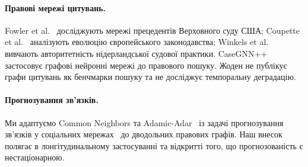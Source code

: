 \paragraph{Правові мережі цитувань.}
Fowler et al.~\citep{fowler2007network} досліджують мережі прецедентів Верховного суду США; Coupette et al.~\citep{coupette2021measuring} аналізують еволюцію європейського законодавства; Winkels et al.~\citep{winkels2011determining} вивчають авторитетність нідерландської судової практики.
CaseGNN++~\citep{tang2024casegnn} застосовує графові нейронні мережі до правового пошуку.
Жоден не публікує графи цитувань як бенчмарки пошуку та не досліджує темпоральну деградацію.

\paragraph{Прогнозування зв'язків.}
Ми адаптуємо Common Neighbors та Adamic-Adar~\citep{adamic2003friends} із задачі прогнозування зв'язків у соціальних мережах~\citep{liben2007link} до дводольних правових графів.
Наш внесок полягає в лонгітудинальному застосуванні та відкритті того, що прогнозованість є нестаціонарною.
